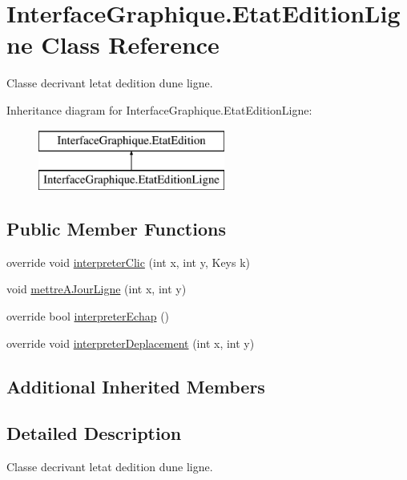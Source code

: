 \hypertarget{class_interface_graphique_1_1_etat_edition_ligne}{}\section{Interface\+Graphique.\+Etat\+Edition\+Ligne Class Reference}
\label{class_interface_graphique_1_1_etat_edition_ligne}


Classe decrivant l\textquotesingle{}etat d\textquotesingle{}edition d\textquotesingle{}une ligne.  


Inheritance diagram for Interface\+Graphique.\+Etat\+Edition\+Ligne\+:\begin{figure}[H]
\begin{center}
\leavevmode
\includegraphics[height=2.000000cm]{class_interface_graphique_1_1_etat_edition_ligne}
\end{center}
\end{figure}
\subsection*{Public Member Functions}
\begin{DoxyCompactItemize}
\item 
override void \hyperlink{group__inf2990_ga8c2be724327977a66650e6987423b95d}{interpreter\+Clic} (int x, int y, Keys k)
\item 
void \hyperlink{group__inf2990_ga208ebe152302ec750de1485e0589b34f}{mettre\+A\+Jour\+Ligne} (int x, int y)
\item 
override bool \hyperlink{group__inf2990_ga77ffb80cb55a5ef9c31c3ebebcf3db16}{interpreter\+Echap} ()
\item 
override void \hyperlink{group__inf2990_gac11a3b90a64b159ac00c59d2fcb349d8}{interpreter\+Deplacement} (int x, int y)
\end{DoxyCompactItemize}
\subsection*{Additional Inherited Members}


\subsection{Detailed Description}
Classe decrivant l\textquotesingle{}etat d\textquotesingle{}edition d\textquotesingle{}une ligne. 


